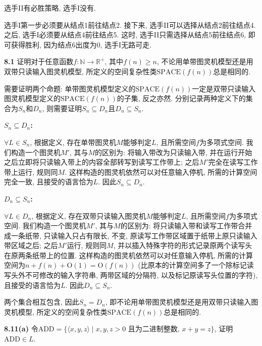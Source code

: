 \documentclass[UTF8]{report}
\newcommand{\R}{\mathbb{R}}
\newcommand{\N}{\mathbb{N}}
\newcommand{\problem}[1]{{\setlength{\parskip}{10pt}\noindent \bf{#1}}}
\newenvironment{solution}{{\noindent\hskip 2em \bf 解 \quad}}{}
\newcommand{\SPACE}{\mathrm{SPACE}}
\renewcommand{\O}{\mathrm{O}}
\newcommand{\ADD}{\mathrm{ADD}}
\begin{document}
\begin{solution}
    选手II有必胜策略, 选手I没有.

    选手I第一步必须要从结点1前往结点2. 接下来, 选手II可以选择从结点2前往结点4. 之后, 选手I必须要从结点4前往结点5. 这时, 选手II只需选择从结点5前往结点6, 即可获得胜利, 因为结点6出度为$0$, 选手I无路可走.
\end{solution}


\problem{8.1} 证明对于任意函数$f: \N \rightarrow \R^+$, 其中$f(n) \geq n$, 不论用单带图灵机模型还是用双带只读输入图灵机模型, 所定义的空间复杂性类$\SPACE(f(n))$总是相同的. 

\begin{solution}
    需要证明两个命题: 单带图灵机模型定义的$\SPACE(f(n))$一定是双带只读输入图灵机模型定义的$\SPACE(f(n))$的子集, 反之亦然. 分别记录两种定义下的集合为$S_n$和$D_n$, 则需要证明$S_n \subseteq D_n$且$D_n \subseteq S_n$.

    \textbf{$S_n \subseteq D_n$:}

    $\forall L \in S_n$, 根据定义, 存在单带图灵机$M$能够判定$L$, 且所需空间$f$为多项式空间. 我们构造一个图灵机$M'$, 其与$M$的区别为: 将输入带改为只读输入带, 并在运行开始之后立即将只读输入带上的内容全部转写到读写工作带上; 之后$M'$完全在读写工作带上运行, 规则同$M$. 这样构造的图灵机依然可以对任意输入停机, 所需的计算空间完全一致, 且接受的语言恰为$L$. 因此$S_n \subseteq D_n$.

    \textbf{$D_n \subseteq S_n$:}

    $\forall L \in D_n$, 根据定义, 存在双带只读输入图灵机$M$能够判定$L$, 且所需空间$f$为多项式空间. 我们构造一个图灵机$M'$, 其与$M$的区别为: 将只读输入带和读写工作带合并成一条纸带, 只读输入只占有限长, 不变, 原读写工作带区域置于纸带上原只读输入带区域之后; 之后$M'$运行, 规则同$M$, 并以插入特殊字符的形式记录原两个读写头在原两条纸带上的位置. 这样构造的图灵机依然可以对任意输入停机, 所需的计算空间为$n + f(n) + \O(1) = \O(f(n))$ (比原本的计算空间多了一个除标记读写头外不可修改的输入字符串, 两带区域的分隔符, 以及标记原读写头位置的字符), 且接受的语言恰为$L$. 因此$D_n \subseteq S_n$.

    两个集合相互包含, 因此$S_n = D_n$, 即不论用单带图灵机模型还是用双带只读输入图灵机模型, 所定义的空间复杂性类$\SPACE(f(n))$总是相同的. 
\end{solution}


\problem{8.11(a)} 令$\ADD = \{ \langle x,y,z \rangle \mid x,y,z > 0 \text{ 且为二进制整数, } x + y = z\}$, 证明$\ADD \in L $. 
\end{document}

